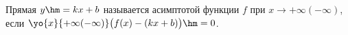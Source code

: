 
  Прямая $y\hm=kx+b$ называется асимптотой функции $f$ при $x\to+\infty(-\infty)$, если $\yo{x}{+\infty(-\infty)}\big(f(x)-(kx+b)\big)\hm=0$.

